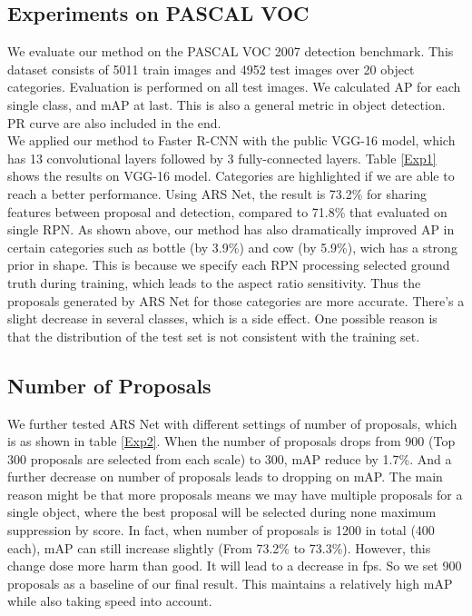\documentclass[10pt,twocolumn,letterpaper]{article}
\begin{document}
\subsection{Experiments on PASCAL VOC}
We evaluate our method on the PASCAL VOC 2007 detection benchmark. This dataset consists of 5011 train images and 4952 test images over 20 object categories. Evaluation is performed on all test images. We calculated AP for each single class, and mAP at last. This is also a general metric in object detection. PR curve are also included in the end. \\
\indent{}We applied our method to Faster R-CNN with the public VGG-16 model, which has 13 convolutional layers followed by 3 fully-connected layers. Table \ref{Exp1} shows the results on VGG-16 model. Categories are highlighted if we are able to reach a better performance. Using ARS Net, the result is 73.2\% for sharing features between proposal and detection, compared to 71.8\% that evaluated on single RPN. As shown above, our method has also dramatically improved AP in certain categories such as bottle (by 3.9\%) and cow (by 5.9\%), wich has a strong prior in shape. This is because we specify each RPN processing selected ground truth during training, which leads to the aspect ratio sensitivity. Thus the proposals generated by ARS Net for those categories are more accurate. There's a slight decrease in several classes, which is a side effect. One possible reason is that the distribution of the test set is not consistent with the training set.

\subsection{Number of Proposals}
We further tested ARS Net with different settings of number of proposals, which is as shown in table \ref{Exp2}. When the number of proposals drops from 900 (Top 300 proposals are selected from each scale) to 300, mAP reduce by 1.7\%. And a further decrease on number of proposals leads to dropping on mAP. The main reason might be that more proposals means we may have multiple proposals for a single object, where the best proposal will be selected during none maximum suppression by score. In fact, when number of proposals is 1200 in total (400 each), mAP can still increase slightly (From 73.2\% to 73.3\%). However, this change dose more harm than good. It will lead to a decrease in fps. So we set 900 proposals as a baseline of our final result. This maintains a relatively high mAP while also taking speed into account.
\end{document}
